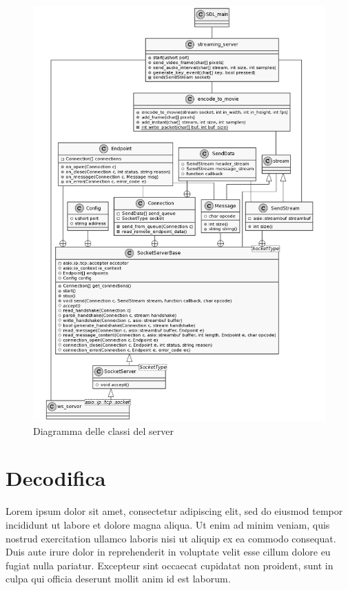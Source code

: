 \begin{figure}[H]
	\includegraphics[width=\linewidth]{immagini/class_server_and_encoding_full}
	\caption{Diagramma delle classi del server}
	\label{fig:class_server_and_encoding_full}
\end{figure}

\section{Decodifica}
Lorem ipsum dolor sit amet, consectetur adipiscing elit, sed do eiusmod tempor incididunt ut labore et dolore magna aliqua. Ut enim ad minim veniam, quis nostrud exercitation ullamco laboris nisi ut aliquip ex ea commodo consequat. Duis aute irure dolor in reprehenderit in voluptate velit esse cillum dolore eu fugiat nulla pariatur. Excepteur sint occaecat cupidatat non proident, sunt in culpa qui officia deserunt mollit anim id est laborum.

